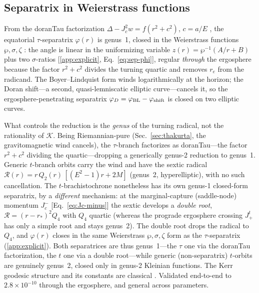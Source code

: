 \documentclass[12pt]{iopart}
\newcommand{\re}{r_{e}}
\newcommand{\Jc}{J_{c}}
\begin{document}
\subsection{Separatrix in Weierstrass functions}
\label{sec:separatrix}
From the doranTau factorization $\Delta-\Jc^2 w=f(r^2+c^2)$, $c=a/E$
\cite{RosignoliKerr}, the
equatorial $\tau$-separatrix $\varphi(r)$ is genus~1, closed in the
Weierstrass functions $\wp,\sigma,\zeta$
\cite{WhittakerWatson,DLMF,Hackmann2008,Hackmann2010}: the angle is linear in the
uniformizing variable $z(r)=\wp^{-1}(A/r+B)$ plus two $\sigma$-ratios
[\ref{app:explicit}, Eq.~\eqref{eq:sep-phi}], regular \emph{through} the
ergosphere because the factor $r^2+c^2$ divides the turning quartic and removes
$\re$ from the radicand. The Boyer--Lindquist form winds logarithmically at the
horizon; the Doran shift---a second, quasi-lemniscatic elliptic
curve---cancels it, so the ergosphere-penetrating separatrix
$\varphi_D=\varphi_{\rm BL}-\varphi_{\rm shift}$ is closed on two elliptic curves.

What controls the reduction is the \emph{genus} of the turning radical, not the
rationality of $\mathcal K$. Being Riemannian-pure
(Sec.~\ref{sec:thakurta}, the gravitomagnetic wind cancels), the $\tau$-branch
factorizes as doranTau---the factor $r^2+c^2$ dividing the quartic---dropping a
generically genus-2 reduction to genus~1. Generic $t$-branch orbits carry the
wind and have the sextic radical
$\mathcal R(r)=r\,Q_2(r)\,[(E^2-1)r+2M]$ (genus~2, hyperelliptic), with no such
cancellation. The $t$-brachistochrone nonetheless has its own genus-1 closed-form
separatrix, by a \emph{different} mechanism: at the marginal-capture (saddle-node)
momentum $J_c^-$ [Eq.~\eqref{eq:Jc-minus}] the sextic develops a \emph{double
root}, $\mathcal R=(r-r_*)^2 Q_4$ with $Q_4$ quartic (whereas the prograde
ergosphere crossing $J_+^t$ has only a simple root and stays genus~2). The double
root drops the radical to $Q_4$, and $\varphi(r)$ closes in the same
Weierstrass $\wp,\sigma,\zeta$ form as the $\tau$-separatrix
(\ref{app:explicit}). Both separatrices are thus genus~1---the $\tau$ one
via the doranTau factorization, the $t$ one via a double root---while generic
(non-separatrix) $t$-orbits are genuinely genus~2, closed only in genus-2
Kleinian functions.
The Kerr geodesic structure and its constants are classical
\cite{Carter1968,Chandrasekhar}. Validated end-to-end to
$2.8\times10^{-10}$ through the ergosphere, and general across parameters.
\end{document}
